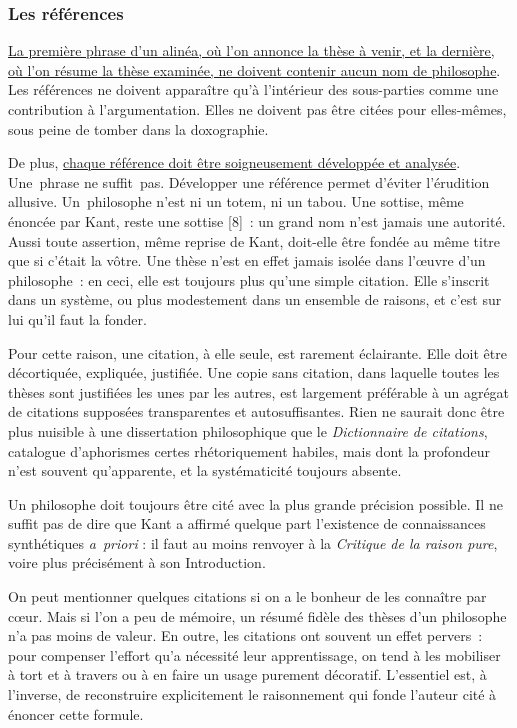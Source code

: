 \documentclass[a4paper,12pt]{article}
\begin{document}
\subsubsection{Les références}
\label{sec:orgf3166d9}

\uline{La première phrase d'un alinéa, où l'on annonce la thèse à venir, et la
dernière, où l'on résume la thèse examinée, ne doivent contenir aucun
nom de philosophe}. Les références ne doivent apparaître qu'à
l'intérieur des sous-parties comme une contribution à l'argumentation.
Elles ne doivent pas être citées pour elles-mêmes, sous peine de tomber
dans la doxographie.

De plus, \uline{chaque référence doit être soigneusement développée et
analysée}. Une phrase ne suffit pas. Développer une référence permet
d'éviter l'érudition allusive. Un philosophe n'est ni un totem, ni un
tabou. Une sottise, même énoncée par Kant, reste une sottise [8] : un
grand nom n'est jamais une autorité. Aussi toute assertion, même reprise
de Kant, doit-elle être fondée au même titre que si c'était la vôtre.
Une thèse n'est en effet jamais isolée dans l'œuvre d'un philosophe : en
ceci, elle est toujours plus qu'une simple citation. Elle s'inscrit dans
un système, ou plus modestement dans un ensemble de raisons, et c'est
sur lui qu'il faut la fonder.

Pour cette raison, une citation, à elle seule, est rarement éclairante.
Elle doit être décortiquée, expliquée, justifiée. Une copie sans
citation, dans laquelle toutes les thèses sont justifiées les unes par
les autres, est largement préférable à un agrégat de citations supposées
transparentes et autosuffisantes. Rien ne saurait donc être plus
nuisible à une dissertation philosophique que le \emph{Dictionnaire de
citations}, catalogue d'aphorismes certes rhétoriquement habiles, mais
dont la profondeur n'est souvent qu'apparente, et la systématicité
toujours absente.

Un philosophe doit toujours être cité avec la plus grande précision
possible. Il ne suffit pas de dire que Kant a affirmé quelque part
l'existence de connaissances synthétiques \emph{a priori} : il faut au moins
renvoyer à la \emph{Critique de la raison pure}, voire plus précisément à son
Introduction.

On peut mentionner quelques citations si on a le bonheur de les
connaître par cœur. Mais si l'on a peu de mémoire, un résumé fidèle des
thèses d'un philosophe n'a pas moins de valeur. En outre, les citations
ont souvent un effet pervers : pour compenser l'effort qu'a nécessité
leur apprentissage, on tend à les mobiliser à tort et à travers ou à en
faire un usage purement décoratif. L'essentiel est, à l'inverse, de
reconstruire explicitement le raisonnement qui fonde l'auteur cité à
énoncer cette formule.
\end{document}

